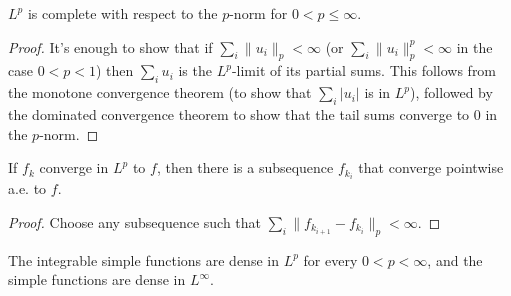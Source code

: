 \begin{thm}\label{Riesz-Fischer-Lp} $L^p$ is complete with respect to the $p$-norm for $0 < p \le \infty$.
\end{thm}
\begin{proof} It's enough to show that if $\sum_i \|u_i\|_p < \infty$ (or $\sum_i \|u_i\|_p^p < \infty$ in the case $0 < p < 1$) then $\sum_i u_i$ is the $L^p$-limit of its partial sums. This follows from the monotone convergence theorem (to show that $\sum_i |u_i|$ is in $L^p$), followed by the dominated convergence theorem to show that the tail sums converge to $0$ in the $p$-norm.
\end{proof}

\begin{cor} If $f_k$ converge in $L^p$ to $f$, then there is a subsequence $f_{k_i}$ that converge pointwise a.e. to $f$.
\end{cor}
\begin{proof} Choose any subsequence such that $\sum_i \|f_{k_{i+1}} - f_{k_i}\|_p < \infty$.
\end{proof}

\begin{prop} The integrable simple functions are dense in $L^p$ for every $0 < p < \infty$, and the simple functions are dense in $L^\infty$.
\end{prop}

